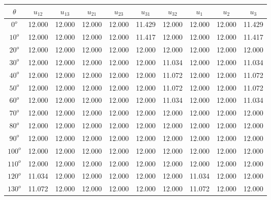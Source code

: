 	\singlespacing
	\begin{table}[H]
	    \centering
	    \begin{tabular}{|c|c|c|c|c|c|c|c|c|c|}
	   \hline
	   $\theta$ & $u_{12}$ & $u_{13}$ & $u_{21}$ & $u_{23}$ & $u_{31}$ & $u_{32}$ & $u_{1}$ & $u_{2}$ & $u_{3}$  \\
	         \hline
	         $0^{o}$ & 12.000 & 12.000 & 12.000 & 12.000 & 11.429 & 12.000 & 12.000 & 12.000 & 11.429  \\
	         \hline
	         $10^{o}$ & 12.000 & 12.000 & 12.000 & 12.000 & 11.417 & 12.000 & 12.000 & 12.000 & 11.417 \\
	         \hline
	         $20^{o}$ & 12.000 & 12.000 & 12.000 & 12.000 & 12.000 & 12.000 & 12.000& 12.000 & 12.000  \\
	         \hline
	         $30^{o}$ & 12.000 & 12.000 & 12.000 & 12.000 & 12.000 & 11.034 & 12.000& 12.000 & 11.034  \\
	         \hline
	         $40^{o}$ & 12.000 & 12.000 & 12.000 & 12.000 & 12.000 & 11.072 & 12.000& 12.000 & 11.072  \\
	         \hline
	         $50^{o}$ & 12.000 & 12.000 & 12.000 & 12.000 & 12.000 & 11.072 & 12.000& 12.000 & 11.072 \\
	         \hline
	         $60^{o}$ & 12.000 & 12.000 & 12.000 & 12.000 & 12.000 & 11.034 & 12.000& 12.000 & 11.034  \\
	         \hline
	         $70^{o}$ & 12.000 & 12.000 & 12.000 & 12.000 & 12.000 & 12.000 & 12.000 & 12.000 & 12.000  \\
	         \hline
	         $80^{o}$ & 12.000 & 12.000 & 12.000 & 12.000 & 12.000 & 12.000 & 12.000& 12.000 & 12.000  \\
	         \hline
	         $90^{o}$ & 12.000 & 12.000 & 12.000 & 12.000 & 12.000 & 12.000 & 12.000& 12.000 & 12.000 \\
	         \hline
	         $100^{o}$ & 12.000 & 12.000 & 12.000 & 12.000 & 12.000 & 12.000 & 12.000& 12.000 & 12.000  \\
	         \hline
	         $110^{o}$ & 12.000 & 12.000 & 12.000 & 12.000 & 12.000 & 12.000 & 12.000& 12.000 & 12.000  \\
	         \hline
	         $120^{o}$ & 11.034 & 12.000 & 12.000 & 12.000 & 12.000 & 12.000 & 11.034 & 12.000 & 12.000  \\
	         \hline
	         $130^{o}$ & 11.072 & 12.000 & 12.000 & 12.000 & 12.000 & 12.000 & 11.072 & 12.000 & 12.000  \\
	         \hline

\end{tabular}
\end{table}
